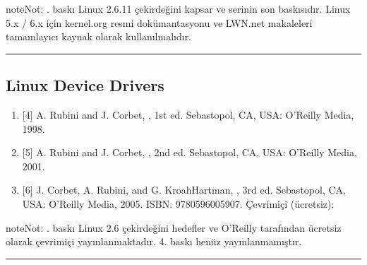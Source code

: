 \documentclass[a4paper,10pt,turkish]{sphinxmanual}
\begin{document}
\begin{sphinxadmonition}{note}{Not:}
. baskı Linux 2.6.11 çekirdeğini kapsar ve serinin son baskısıdır.
Linux 5.x / 6.x için kernel.org resmi dokümantasyonu ve LWN.net
makaleleri tamamlayıcı kaynak olarak kullanılmalıdır.
\end{sphinxadmonition}


\bigskip\hrule\bigskip



\subsection{Linux Device Drivers}
\label{\detokenize{introduction:linux-device-drivers}}\begin{enumerate}
%
\item {} 
\sphinxAtStartPar
{[}4{]} A. Rubini and J. Corbet, , 1st ed.
Sebastopol, CA, USA: O’Reilly Media, 1998.

\item {} 
\sphinxAtStartPar
{[}5{]} A. Rubini and J. Corbet, , 2nd ed.
Sebastopol, CA, USA: O’Reilly Media, 2001.

\item {} 
\sphinxAtStartPar
{[}6{]} J. Corbet, A. Rubini, and G. Kroah\sphinxhyphen{}Hartman, ,
3rd ed. Sebastopol, CA, USA: O’Reilly Media, 2005.
ISBN: 978\sphinxhyphen{}0\sphinxhyphen{}596\sphinxhyphen{}00590\sphinxhyphen{}7.
Çevrimiçi (ücretsiz): 

\end{enumerate}

\begin{sphinxadmonition}{note}{Not:}
. baskı Linux 2.6 çekirdeğini hedefler ve O’Reilly tarafından
ücretsiz olarak çevrimiçi yayınlanmaktadır. 4. baskı henüz
yayınlanmamıştır.
\end{sphinxadmonition}


\bigskip\hrule\bigskip
\end{document}
